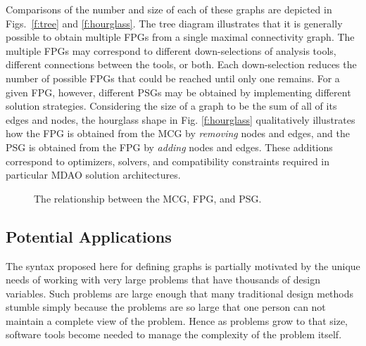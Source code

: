   Comparisons of the number and size of each of these graphs are depicted in Figs.~\ref{f:tree} and \ref{f:hourglass}. 
  The tree diagram illustrates that it is generally possible to obtain 
  multiple FPGs from a single maximal connectivity graph. The multiple FPGs may correspond to 
  different down-selections of analysis tools, different connections between the tools, 
  or both. Each down-selection reduces the number of possible FPGs that could be reached 
  until only one remains. For a given FPG, however, different PSGs may be obtained by implementing 
  different solution strategies. Considering the size of a graph to be the sum of all of its
  edges and nodes, the hourglass shape in Fig. \ref{f:hourglass} qualitatively illustrates how
  the FPG is obtained from the MCG by \emph{removing} nodes and edges, 
  and the PSG is obtained from the FPG by \emph{adding} nodes and edges.
These additions correspond to optimizers, solvers, and compatibility constraints required in particular MDAO solution architectures.
\begin{figure}[htb!]
    \centering
  \caption{The relationship between the MCG, FPG, and PSG.}
  \end{figure}

\subsection{Potential Applications}

The syntax proposed here for defining graphs is partially motivated by the unique needs
of working with very large problems that have thousands of design variables. Such problems are 
large enough that many traditional design methods stumble simply because the problems 
are so large that one person can not maintain a complete view of the problem. Hence as problems 
grow to that size, software tools become needed to manage the complexity of the problem itself. 

